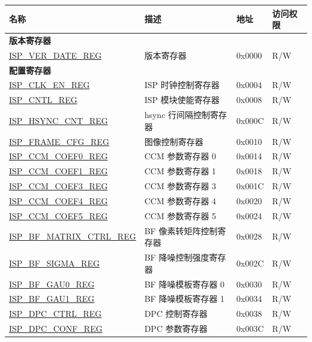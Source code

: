 \begin{longtable}{ | p{6cm} | p{7.2cm} | p{1.3cm} | p{1cm} | }
\hline\rowcolor{lightgray}
\textbf{名称} & \textbf{描述} &  \textbf{地址} & \textbf{访问权限} \\ \hline
\endhead
\multicolumn{4}{|l|}{\textbf{版本寄存器}} \\ \hline
\hyperref[regdesc:ISPVERDATEREG]{ISP\_VER\_DATE\_REG} & 版本寄存器 & 0x0000 & R/W \\ \hline

\multicolumn{4}{|l|}{\textbf{配置寄存器}} \\ \hline
\hyperref[regdesc:ISPCLKENREG]{ISP\_CLK\_EN\_REG} & ISP 时钟控制寄存器 & 0x0004 & R/W \\ \hline
\hyperref[regdesc:ISPCNTLREG]{ISP\_CNTL\_REG} & ISP 模块使能寄存器 & 0x0008 & R/W \\ \hline
\hyperref[regdesc:ISPHSYNCCNTREG]{ISP\_HSYNC\_CNT\_REG} & hsync 行间隔控制寄存器 & 0x000C & R/W \\ \hline
\hyperref[regdesc:ISPFRAMECFGREG]{ISP\_FRAME\_CFG\_REG} & 图像控制寄存器 & 0x0010 & R/W \\ \hline
\hyperref[regdesc:ISPCCMCOEF0REG]{ISP\_CCM\_COEF0\_REG} & CCM 参数寄存器 0 & 0x0014 & R/W \\ \hline
\hyperref[regdesc:ISPCCMCOEF1REG]{ISP\_CCM\_COEF1\_REG} & CCM 参数寄存器 1 & 0x0018 & R/W \\ \hline
\hyperref[regdesc:ISPCCMCOEF3REG]{ISP\_CCM\_COEF3\_REG} & CCM 参数寄存器 3 & 0x001C & R/W \\ \hline
\hyperref[regdesc:ISPCCMCOEF4REG]{ISP\_CCM\_COEF4\_REG} & CCM 参数寄存器 4 & 0x0020 & R/W \\ \hline
\hyperref[regdesc:ISPCCMCOEF5REG]{ISP\_CCM\_COEF5\_REG} & CCM 参数寄存器 5 & 0x0024 & R/W \\ \hline
\hyperref[regdesc:ISPBFMATRIXCTRLREG]{ISP\_BF\_MATRIX\_CTRL\_REG} & BF 像素转矩阵控制寄存器 & 0x0028 & R/W \\ \hline
\hyperref[regdesc:ISPBFSIGMAREG]{ISP\_BF\_SIGMA\_REG} & BF 降噪控制强度寄存器 & 0x002C & R/W \\ \hline
\hyperref[regdesc:ISPBFGAU0REG]{ISP\_BF\_GAU0\_REG} & BF 降噪模板寄存器 0 & 0x0030 & R/W \\ \hline
\hyperref[regdesc:ISPBFGAU1REG]{ISP\_BF\_GAU1\_REG} & BF 降噪模板寄存器 1 & 0x0034 & R/W \\ \hline
\hyperref[regdesc:ISPDPCCTRLREG]{ISP\_DPC\_CTRL\_REG} & DPC 控制寄存器 & 0x0038 & R/W \\ \hline
\hyperref[regdesc:ISPDPCCONFREG]{ISP\_DPC\_CONF\_REG} & DPC 参数寄存器 & 0x003C & R/W \\ \hline

\end{longtable}
